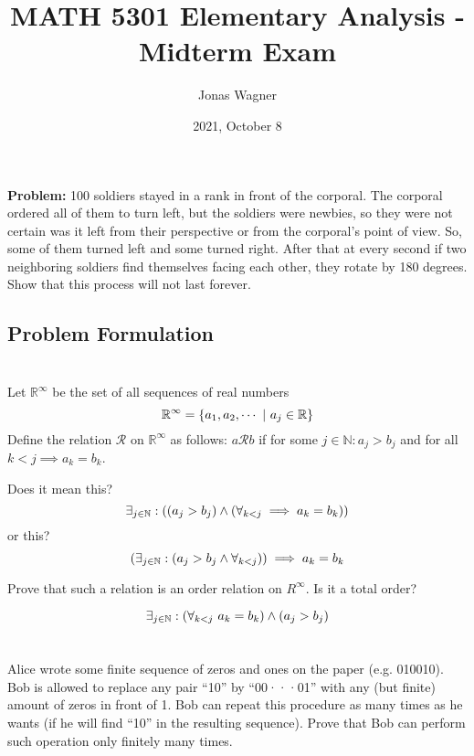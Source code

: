 \documentclass[]{article}
\title{MATH 5301 Elementary Analysis - Midterm Exam}
\author{Jonas Wagner}
\date{2021, October 8}
\newcommand{\Rel}{\mathcal{R}}
\newcommand{\R}{\mathbb{R}}
\newcommand{\N}{\mathbb{N}}
\begin{document}
\maketitle

\section{}
\textbf{Problem:} 100 soldiers stayed in a rank in front of the corporal. 
The corporal ordered all of them to turn left, but the soldiers were newbies, 
so they were not certain was it left from their perspective or from the corporal’s 
point of view. So, some of them turned left and some turned right. After that 
at every second if two neighboring soldiers find themselves facing each other,
they rotate by 180 degrees. Show that this process will not last forever.

\subsection*{Problem Formulation}













\newpage
\section{}
Let $\R^\infty$ be the set of all sequences of real numbers
$$\R^\infty = \qty{a_1,a_2,\cdots \ | \ a_j \in \R}$$
Define the relation $\Rel$ on $\R^\infty$ as follows:
$a\Rel b$ if for some $j \in \N : a_j > b_j$ and for all $k < j \implies a_k = b_k$.


Does it mean this?
$$\exists_{j \in \N} : \qty((a_j > b_j) \land (\forall_{k<j} \implies a_k = b_k))$$
or this?
$$\qty(\exists_{j \in \N} : (a_j > b_j \land \forall_{k<j})) \implies a_k = b_k$$

Prove that such a relation is an order relation on $R^\infty$. Is it a total order?



$$\exists_{j\in\N} : \qty(\forall_{k < j} \ a_k = b_k) \land (a_j > b_j)$$







\newpage
\section{}
Alice wrote some finite sequence of zeros and ones on the paper (e.g. 010010). 
Bob is allowed to replace any pair ``10'' by ``00···01'' with any (but finite) 
amount of zeros in front of 1. Bob can repeat this procedure as many times as 
he wants (if he will find ``10'' in the resulting sequence). 
Prove that Bob can perform such operation only finitely many times.
\end{document}
